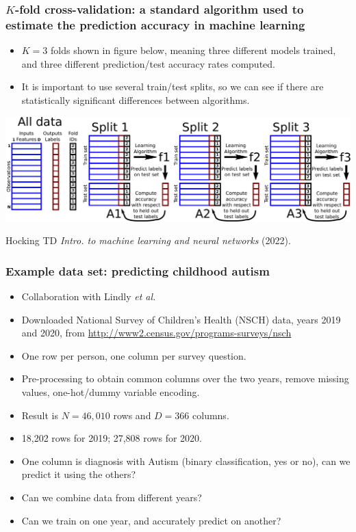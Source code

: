 \documentclass{beamer}
\begin{document}
\begin{frame}
  \frametitle{$K$-fold cross-validation: a standard algorithm used to estimate the prediction accuracy in machine learning}

  \begin{itemize}
  \item $K=3$ folds shown in figure below, meaning three different
    models trained, and three different prediction/test accuracy rates
    computed.
  \item It is important to use several train/test splits, so we can
    see if there are statistically significant differences between
    algorithms.
  \end{itemize}

  \includegraphics[width=\textwidth]{drawing-cross-validation.pdf}

  \small Hocking TD \emph{Intro. to machine learning and neural
    networks} (2022).
\end{frame}

\begin{frame}
  \frametitle{Example data set: predicting childhood autism}

  \begin{itemize}
  \item Collaboration with Lindly \emph{et al.}
  \item Downloaded National Survey of Children's Health (NSCH) data,
    years 2019 and 2020, from
    \url{http://www2.census.gov/programs-surveys/nsch}
  \item One row per person, one column per survey question.
  \item Pre-processing to obtain common columns over the two years,
    remove missing values, one-hot/dummy variable encoding.
  \item Result is $N=46,010$ rows and $D=366$ columns.
  \item 18,202 rows for 2019; 27,808 rows for 2020.
  \item One column is diagnosis with Autism (binary
    classification, yes or no), can we predict it using the others?
  \item Can we combine data from different years?
  \item Can we train on one year, and accurately predict on another?
  \end{itemize}

\end{frame} 
\end{document}
